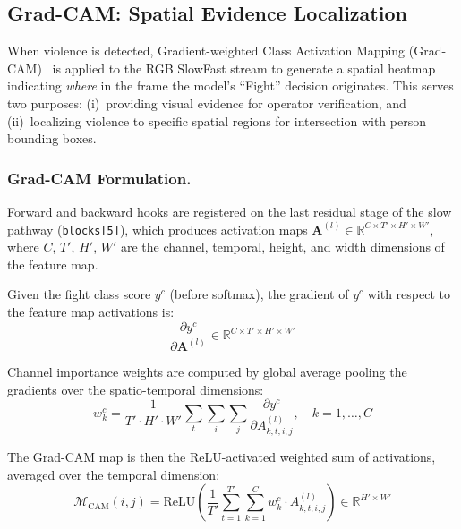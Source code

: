 \documentclass[11pt,a4paper]{article}
\newcommand{\R}{\mathbb{R}}
\newcommand{\relu}{\mathrm{ReLU}}
\begin{document}
\subsection{Grad-CAM: Spatial Evidence Localization}
\label{subsec:gradcam}

When violence is detected, Gradient-weighted Class Activation Mapping (Grad-CAM)~\cite{gradcam} is applied to the RGB SlowFast stream to generate a spatial heatmap indicating \emph{where} in the frame the model's ``Fight'' decision originates. This serves two purposes: (i)~providing visual evidence for operator verification, and (ii)~localizing violence to specific spatial regions for intersection with person bounding boxes.

\subsubsection{Grad-CAM Formulation.}
Forward and backward hooks are registered on the last residual stage of the slow pathway (\texttt{blocks[5]}), which produces activation maps $\mathbf{A}^{(l)} \in \R^{C \times T' \times H' \times W'}$, where $C$, $T'$, $H'$, $W'$ are the channel, temporal, height, and width dimensions of the feature map.

Given the fight class score $y^c$ (before softmax), the gradient of $y^c$ with respect to the feature map activations is:
\begin{equation}
\frac{\partial y^c}{\partial \mathbf{A}^{(l)}} \in \R^{C \times T' \times H' \times W'}
\end{equation}

Channel importance weights are computed by global average pooling the gradients over the spatio-temporal dimensions:
\begin{equation}
w_k^c = \frac{1}{T' \cdot H' \cdot W'} \sum_{t} \sum_{i} \sum_{j} \frac{\partial y^c}{\partial A_{k,t,i,j}^{(l)}}, \quad k = 1, \ldots, C
\label{eq:gradcam_weights}
\end{equation}

The Grad-CAM map is then the ReLU-activated weighted sum of activations, averaged over the temporal dimension:
\begin{equation}
\mathcal{M}_{\text{CAM}}(i, j) = \relu\!\left(\frac{1}{T'}\sum_{t=1}^{T'}\sum_{k=1}^{C} w_k^c \cdot A_{k,t,i,j}^{(l)}\right) \in \R^{H' \times W'}
\label{eq:gradcam_map}
\end{equation}
\end{document}
